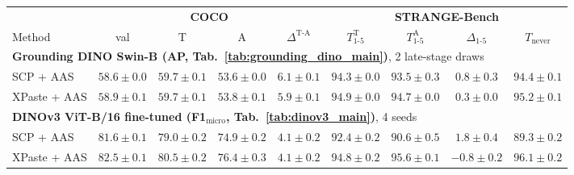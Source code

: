 \begin{tabular}{l cccc cccc}
\toprule
& \multicolumn{4}{c}{\textbf{COCO}} & \multicolumn{4}{c}{\textbf{STRANGE-Bench}} \\
\cmidrule(lr){2-5} \cmidrule(lr){6-9}
Method & val & T & A & $\Delta^{\text{T-A}}$ & $T_{1\text{-}5}^{\text{T}}$ & $T_{1\text{-}5}^{\text{A}}$ & $\Delta_{1\text{-}5}$ & $T_{\text{never}}$ \\
\midrule
\multicolumn{9}{l}{\textbf{Grounding DINO Swin-B (AP, Tab.~\ref{tab:grounding_dino_main})}, 2 late-stage draws} \\
SCP + AAS & $58.6{\pm}0.0$ & $59.7{\pm}0.1$ & $53.6{\pm}0.0$ & $6.1{\pm}0.1$ & $94.3{\pm}0.0$ & $93.5{\pm}0.3$ & $0.8{\pm}0.3$ & $94.4{\pm}0.1$ \\
XPaste + AAS & $58.9{\pm}0.1$ & $59.7{\pm}0.1$ & $53.8{\pm}0.1$ & $5.9{\pm}0.1$ & $94.9{\pm}0.0$ & $94.7{\pm}0.0$ & $0.3{\pm}0.0$ & $95.2{\pm}0.1$ \\
\midrule
\multicolumn{9}{l}{\textbf{DINOv3 ViT-B/16 fine-tuned (F1$_{\text{micro}}$, Tab.~\ref{tab:dinov3_main})}, 4 seeds} \\
SCP + AAS & $81.6{\pm}0.1$ & $79.0{\pm}0.2$ & $74.9{\pm}0.2$ & $4.1{\pm}0.2$ & $92.4{\pm}0.2$ & $90.6{\pm}0.5$ & $1.8{\pm}0.4$ & $89.3{\pm}0.2$ \\
XPaste + AAS & $82.5{\pm}0.1$ & $80.5{\pm}0.2$ & $76.4{\pm}0.3$ & $4.1{\pm}0.2$ & $94.8{\pm}0.2$ & $95.6{\pm}0.1$ & $-0.8{\pm}0.2$ & $96.1{\pm}0.2$ \\
\bottomrule
\end{tabular}
